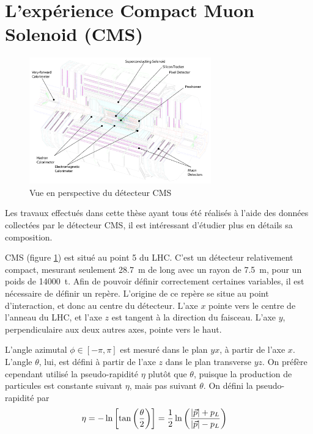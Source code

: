 % 

\section{L'expérience Compact Muon Solenoid (CMS)} \label{sec:cms}

\begin{figure} \centering
  \includegraphics[width=0.7\textwidth]{chapitre2/figs/CMS_2.pdf}
  \caption{Vue en perspective du détecteur CMS}
  \label{fig:cms}
\end{figure}

Les travaux effectués dans cette thèse ayant tous été réalisés à l'aide des données collectées par le détecteur CMS, il est intéressant d'étudier plus en détails sa composition.

\bigskip

CMS (figure \ref{fig:cms}) est situé au point 5 du LHC. C'est un détecteur relativement compact, mesurant seulement \SI{28.7}{\m} de long avec un rayon de \SI{7.5}{\m}, pour un poids de \SI{14000}{\tonne}. Afin de pouvoir définir correctement certaines variables, il est nécessaire de définir un repère. L'origine de ce repère se situe au point d'interaction, et donc au centre du détecteur. L'axe $x$ pointe vers le centre de l'anneau du LHC, et l'axe $z$ est tangent à la direction du faisceau. L'axe $y$, perpendiculaire aux deux autres axes, pointe vers le haut.

L'angle azimutal $\phi \in \left[-\pi, \pi\right]$ est mesuré dans le plan $yx$, à partir de l'axe $x$. L'angle $\theta$, lui, est défini à partir de l'axe $z$ dans le plan transverse $yz$. On préfère cependant utilisé la pseudo-rapidité $\eta$ plutôt que $\theta$, puisque la production de particules est constante suivant $\eta$, mais pas suivant $\theta$. On défini la pseudo-rapidité par
\begin{align*}
  \eta &= -\ln\left[\tan\left(\frac{\theta}{2}\right)\right] = \frac{1}{2} \ln\left(\frac{\lvert \vec{p} \rvert + p_L}{\lvert \vec{p} \rvert - p_L}\right)
\end{align*}

